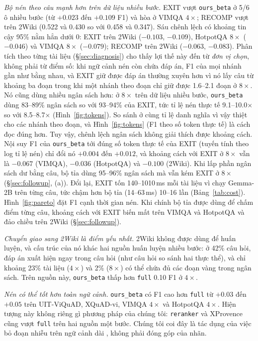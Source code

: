 \documentclass[11pt]{article}
\newcommand{\arm}[1]{\texttt{#1}}
\begin{document}
\emph{Bộ nén theo câu mạnh hơn trên dữ liệu nhiều bước.} EXIT vượt \arm{ours\_beta} ở 5/6 ô nhiều bước
(từ $+0.023$ đến $+0.109$ F1) và hòa ở VIMQA $4\times$; RECOMP vượt trên 2Wiki (0.522 và 0.430 so với 0.458 và
0.347). Sáu chênh lệch có khoảng tin cậy 95\% nằm hẳn dưới 0: EXIT trên 2Wiki ($-0.103$, $-0.109$), HotpotQA
$8\times$ ($-0.046$) và VIMQA $8\times$ ($-0.079$); RECOMP trên 2Wiki ($-0.063$, $-0.083$). Phân tích theo từng
tài liệu (\S\ref{sec:diagnosis}) cho thấy lợi thế này đến từ \emph{đơn vị chọn}, không phải từ điểm số: khi
ngữ cảnh nén còn chứa đáp án, F1 của mọi nhánh gần như bằng nhau, và EXIT giữ được đáp án thường xuyên hơn vì
nó lấy câu từ khoảng ba đoạn trong khi một nhánh theo đoạn chỉ giữ được 1.6--2.1 đoạn ở $8\times$. Nó cũng
dùng nhiều ngân sách hơn: ở $8\times$ trên dữ liệu nhiều bước, \arm{ours\_beta} dùng 83--89\% ngân sách so với
93--94\% của EXIT, tức tỉ lệ nén thực tế 9.1--10.0$\times$ so với 8.5--8.7$\times$ (Hình~\ref{fig:tokens}). So
sánh ở cùng tỉ lệ danh nghĩa vì vậy thiệt cho các nhánh theo đoạn, và Hình~\ref{fig:tokens} (F1 theo số token thực tế)
là cách đọc đúng hơn. Tuy vậy, chênh lệch ngân sách không giải thích được khoảng cách. Nội suy F1 của \arm{ours\_beta} tới đúng số token thực tế
của EXIT (tuyến tính theo log tỉ lệ nén) chỉ đổi nó $+0.004$ đến $+0.012$, và khoảng cách với EXIT ở $8\times$ vẫn là $-0.067$
(VIMQA), $-0.036$ (HotpotQA) và $-0.100$ (2Wiki). Khi lấp phần ngân sách dư bằng câu, bộ tỉa dùng 95--96\% ngân sách mà vẫn kém EXIT ở $8\times$ (\S\ref{sec:followup}, (a)).
Đổi lại, EXIT tốn 140--1010\,ms mỗi tài liệu vì chạy Gemma-2B trên từng câu, tức chậm hơn bộ tỉa (14--63\,ms)
10--16 lần (Bảng~\ref{tab:cost}). Hình~\ref{fig:pareto} đặt F1 cạnh thời gian nén. Khi chính bộ tỉa được dùng
để chấm điểm từng câu, khoảng cách với EXIT biến mất trên VIMQA và HotpotQA và đảo chiều trên 2Wiki
(\S\ref{sec:followup}).

\emph{Chuyển giao sang 2Wiki là điểm yếu nhất.} 2Wiki không được dùng để huấn luyện, và cấu trúc của nó khác
hai nguồn huấn luyện nhiều bước: ở 42\% câu hỏi, đáp án xuất hiện ngay trong câu hỏi (như câu hỏi so sánh hai
thực thể), và chỉ khoảng
23\% tài liệu ($4\times$) và 2\% ($8\times$) có thể chứa đủ các đoạn vàng trong ngân sách. Trên nguồn này,
\arm{ours\_beta} thấp hơn \arm{full} 0.10 F1 ở $4\times$.

\emph{Nén có thể tốt hơn toàn ngữ cảnh.} \arm{ours\_beta} có F1 cao hơn \arm{full} từ $+0.03$ đến $+0.05$
trên UIT-ViQuAD, XQuAD-vi, VIMQA $4\times$ và HotpotQA $4\times$. Hiện tượng này không riêng gì phương
pháp của chúng tôi: \arm{reranker} và XProvence cũng vượt \arm{full} trên hai nguồn một bước. Chúng tôi
coi đây là tác dụng của việc bỏ đoạn nhiễu trên ngữ cảnh dài \citep{liu2024lost}, không phải đóng góp
của nhãn.
\end{document}
